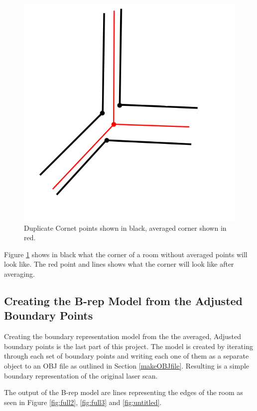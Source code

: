			\begin{figure}
				\centering
				\includegraphics[width=0.7\linewidth]{Includes/images/CornerAveraging}
				\caption{Duplicate Cornet points shown in black, averaged corner shown in red.}
				\label{fig:CornerAveraging}
			\end{figure}
			
			Figure \ref{fig:CornerAveraging} shows in black what the corner of a room without averaged points will look like. The red point and lines shows what the corner will look like after averaging.


		\subsection{Creating the B-rep Model from the Adjusted Boundary Points}
			Creating the boundary representation model from the the averaged, Adjusted boundary points is the last part of this project. The model is created by iterating through each set of boundary points and writing each one of them as a separate object to an OBJ file as outlined in Section \ref{makeOBJfile}. Resulting is a simple boundary representation of the original laser scan.
			
			The output of the B-rep model are lines representing the edges of the room as seen in Figure \ref{fig:full2}, \ref{fig:full3} and \ref{fig:untitled}.
			
